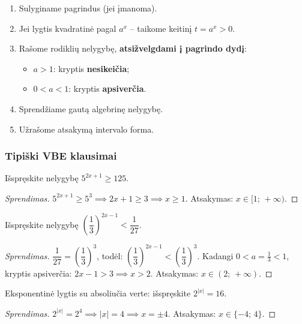 \begin{tcolorbox}[title={Eksponentinių nelygybių sprendimo algoritmas}]
\begin{enumerate}
    \item Sulyginame pagrindus (jei įmanoma).
    \item Jei lygtis kvadratinė pagal $a^x$ – taikome keitinį $t = a^x > 0$.
    \item Rašome rodiklių nelygybę, \textbf{atsižvelgdami į pagrindo dydį}:
    \begin{itemize}
        \item $a > 1$: kryptis \textbf{nesikeičia};
        \item $0 < a < 1$: kryptis \textbf{apsiverčia}.
    \end{itemize}
    \item Sprendžiame gautą algebrinę nelygybę.
    \item Užrašome atsakymą intervalo forma.
\end{enumerate}
\end{tcolorbox}

\subsubsection*{Tipiški VBE klausimai}

\begin{exercise}
Išspręskite nelygybę $5^{2x+1} \geq 125$.
\end{exercise}
\begin{proof}[Sprendimas]
$5^{2x+1} \geq 5^3 \implies 2x + 1 \geq 3 \implies x \geq 1$.
Atsakymas: $x \in [1;\, +\infty)$.
\end{proof}

\begin{exercise}
Išspręskite nelygybę $\left(\dfrac{1}{3}\right)^{2x-1} < \dfrac{1}{27}$.
\end{exercise}
\begin{proof}[Sprendimas]
$\dfrac{1}{27} = \left(\dfrac{1}{3}\right)^3$, todėl:
$\left(\dfrac{1}{3}\right)^{2x-1} < \left(\dfrac{1}{3}\right)^3$.
Kadangi $0 < a = \tfrac{1}{3} < 1$, kryptis apsiverčia:
$2x - 1 > 3 \implies x > 2$.
Atsakymas: $x \in (2;\, +\infty)$.
\end{proof}

\begin{exercise}
Eksponentinė lygtis su absoliučia verte: išspręskite $2^{|x|} = 16$.
\end{exercise}
\begin{proof}[Sprendimas]
$2^{|x|} = 2^4 \implies |x| = 4 \implies x = \pm 4$.
Atsakymas: $x \in \{-4;\, 4\}$.
\end{proof}


